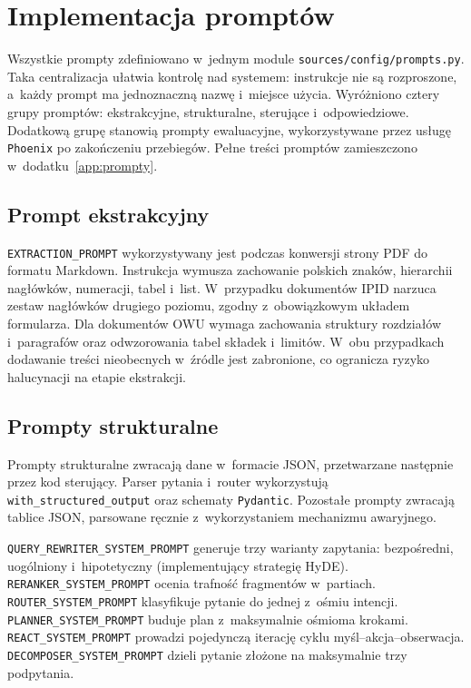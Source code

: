 \section{Implementacja promptów}\label{sec:implementacja-promptow}

Wszystkie prompty zdefiniowano w~jednym module
\texttt{sources/config/prompts.py}. Taka centralizacja ułatwia kontrolę nad
systemem: instrukcje nie są rozproszone, a~każdy prompt ma jednoznaczną nazwę
i~miejsce użycia. Wyróżniono cztery grupy promptów: ekstrakcyjne, strukturalne,
sterujące i~odpowiedziowe. Dodatkową grupę stanowią prompty ewaluacyjne,
wykorzystywane przez usługę \texttt{Phoenix} po zakończeniu przebiegów. Pełne
treści promptów zamieszczono w~dodatku~\ref{app:prompty}.

\subsection{Prompt ekstrakcyjny}\label{subsec:prompt-ekstrakcyjny}

\texttt{EXTRACTION\_PROMPT} wykorzystywany jest podczas konwersji strony
PDF do formatu Markdown. Instrukcja wymusza zachowanie polskich znaków,
hierarchii nagłówków, numeracji, tabel i~list. W~przypadku dokumentów IPID
narzuca zestaw nagłówków drugiego poziomu, zgodny z~obowiązkowym układem
formularza. Dla dokumentów OWU wymaga zachowania struktury rozdziałów
i~paragrafów oraz odwzorowania tabel składek i~limitów. W~obu przypadkach
dodawanie treści nieobecnych w~źródle jest zabronione, co ogranicza ryzyko
halucynacji na etapie ekstrakcji.

\subsection{Prompty strukturalne}\label{subsec:prompty-strukturalne}

Prompty strukturalne zwracają dane w~formacie JSON, przetwarzane następnie
przez kod sterujący. Parser pytania i~router wykorzystują
\texttt{with\_structured\_output} oraz schematy \texttt{Pydantic}. Pozostałe
prompty zwracają tablice JSON, parsowane ręcznie z~wykorzystaniem mechanizmu
awaryjnego.

\texttt{QUERY\_REWRITER\_SYSTEM\_PROMPT} generuje trzy warianty zapytania:
bezpośredni, uogólniony i~hipotetyczny (implementujący strategię HyDE).
\texttt{RERANKER\_SYSTEM\_PROMPT} ocenia trafność fragmentów w~partiach.
\texttt{ROUTER\_SYSTEM\_PROMPT} klasyfikuje pytanie do jednej z~ośmiu intencji.
\texttt{PLANNER\_SYSTEM\_PROMPT} buduje plan z~maksymalnie ośmioma krokami.
\texttt{REACT\_SYSTEM\_PROMPT} prowadzi pojedynczą iterację cyklu
myśl--akcja--obserwacja. \texttt{DECOMPOSER\_SYSTEM\_PROMPT} dzieli pytanie
złożone na maksymalnie trzy podpytania.

